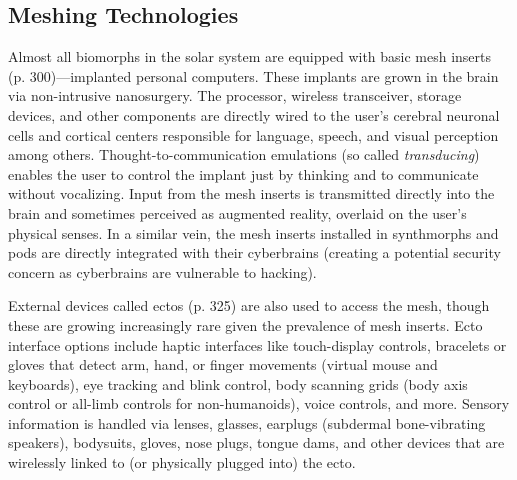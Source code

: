 \subsection{Meshing Technologies} 

Almost all biomorphs in the solar system are equipped with basic mesh inserts (p. 300)—implanted personal computers. These implants are grown in the brain via non-intrusive nanosurgery. The processor, wireless transceiver, storage devices, and other components are directly wired to the user's cerebral neuronal cells and cortical centers responsible for language, speech, and visual perception among others. Thought-to-communication emulations (so called \textit{transducing}) enables the user to control the implant just by thinking and to communicate without vocalizing. Input from the mesh inserts is transmitted directly into the brain and sometimes perceived as augmented reality, overlaid on the user's physical senses. In a similar vein, the mesh inserts installed in synthmorphs and pods are directly integrated with their cyberbrains (creating a potential security concern as cyberbrains are vulnerable to hacking). 

External devices called ectos (p. 325) are also used to access the mesh, though these are growing increasingly rare given the prevalence of mesh inserts. Ecto interface options include haptic interfaces like touch-display controls, bracelets or gloves that detect arm, hand, or finger movements (virtual mouse and keyboards), eye tracking and blink control, body scanning grids (body axis control or all-limb controls for non-humanoids), voice controls, and more. Sensory information is handled via lenses, glasses, earplugs (subdermal bone-vibrating speakers), bodysuits, gloves, nose plugs, tongue dams, and other devices that are wirelessly linked to (or physically plugged into) the ecto. 

